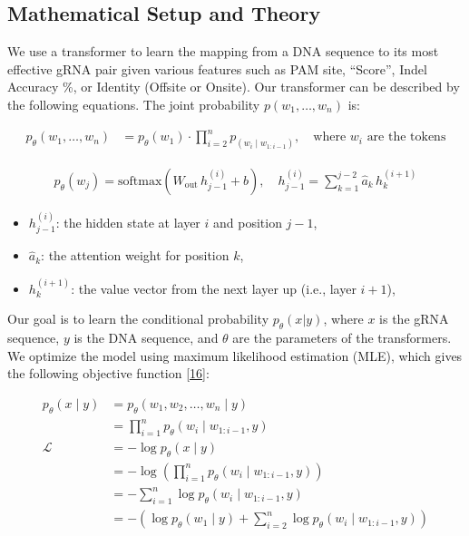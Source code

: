 \documentclass{article}
\begin{document}
\subsection{Mathematical Setup and Theory} 
We use a transformer to learn the mapping from a DNA sequence to its most effective gRNA pair given various features such as PAM site, “Score”, Indel Accuracy \%, or Identity (Offsite or Onsite). Our transformer can be described by the following equations. The joint probability $p(w_1, \dots, w_n)$ is:


\small{
  \begin{align}
    p_\theta(w_1, \dots , w_n) & = p_\theta(w_1) \cdot \prod_{i=2}^{n} p_(w_i \mid w_{1:i-1}) , \quad \text{where } w_i \text{ are the tokens}
  \end{align}
 } 

\vspace{-1em}
\begin{align}
p_\theta(w_j) = \text{softmax}(W_{\text{out}} \, h^{(i)}_{j-1} + b), \quad h^{(i)}_{j-1} = \sum_{k=1}^{j-2} \hat{a}_k \, h_k^{(i+1)}
\end{align}

\small
\vspace{-1em}

\begin{itemize}
  \item $h^{(i)}_{j-1}$: the hidden state at layer $i$ and position $j - 1$,
  \item $\hat{a}_k$: the attention weight for position $k$,
  \item $h^{(i+1)}_k$: the value vector from the next layer up (i.e., layer $i + 1$),
\end{itemize}

Our goal is to learn the conditional probability $p_\theta(x|y)$, where $x$ is the gRNA sequence, $y$ is the DNA sequence, and $\theta$ are the parameters of the transformers. 
We optimize the model using maximum likelihood estimation (MLE), which gives the following objective function \hyperref[Reference 16]{[16]}:

\begin{align}
    p_\theta(x \mid y) &= p_\theta(w_1, w_2, \dots, w_n \mid y) \\
    &= \prod_{i=1}^{n} p_\theta(w_i \mid w_{1:i-1}, y) \\
    \mathcal{L} &= - \log p_\theta(x \mid y) \\
    &= - \log \left( \prod_{i=1}^{n} p_\theta(w_i \mid w_{1:i-1}, y) \right) \\
    &= - \sum_{i=1}^{n} \log p_\theta(w_i \mid w_{1:i-1}, y) \\
    &= - \left( \log p_\theta(w_1 \mid y) + \sum_{i=2}^{n} \log p_\theta(w_i \mid w_{1:i-1}, y) \right)
\end{align}
\end{document}
